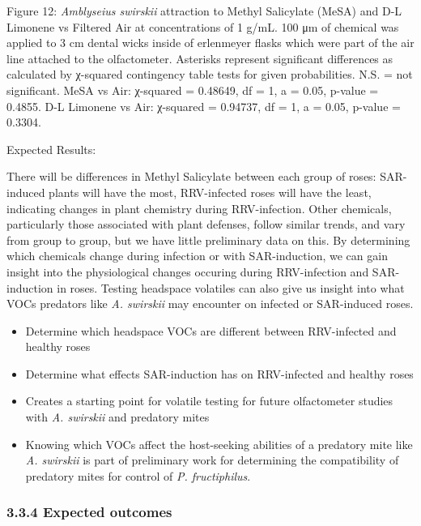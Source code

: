 \documentclass[12pt,final,CPage]{ufthesis}
\begin{document}
{  Figure 12: \emph{Amblyseius swirskii} attraction to Methyl Salicylate (MeSA) and D-L Limonene vs Filtered Air at concentrations of 1 g/mL. 100 μm of chemical was applied to 3 cm dental wicks inside of erlenmeyer flasks which were part of the air line attached to the olfactometer. Asterisks represent significant differences as calculated by χ-squared contingency table tests for given probabilities. N.S. = not significant. MeSA vs Air: χ-squared = 0.48649, df = 1, a = 0.05, p-value = 0.4855. D-L Limonene vs Air: χ-squared = 0.94737, df = 1, a = 0.05, p-value = 0.3304.

  Expected Results:

  There will be differences in Methyl Salicylate between each group of roses: SAR-induced plants will have the most, RRV-infected roses will have the least, indicating changes in plant chemistry during RRV-infection. Other chemicals, particularly those associated with plant defenses, follow similar trends, and vary from group to group, but we have little preliminary data on this. By determining which chemicals change during infection or with SAR-induction, we can gain insight into the physiological changes occuring during RRV-infection and SAR-induction in roses. Testing headspace volatiles can also give us insight into what VOCs predators like \emph{A. swirskii} may encounter on infected or SAR-induced roses.
  \begin{itemize}
  \item
    Determine which headspace VOCs are different between RRV-infected and healthy roses
  \item
    Determine what effects SAR-induction has on RRV-infected and healthy roses
  \item
    Creates a starting point for volatile testing for future olfactometer studies with \emph{A. swirskii} and predatory mites
  \item
    Knowing which VOCs affect the host-seeking abilities of a predatory mite like \emph{A. swirskii} is part of preliminary work for determining the compatibility of predatory mites for control of \emph{P. fructiphilus}.
  \end{itemize}
  \hypertarget{expected-outcomes-2}{%
  \subsubsection{3.3.4 Expected outcomes}\label{expected-outcomes-2}}

}
\end{document}
